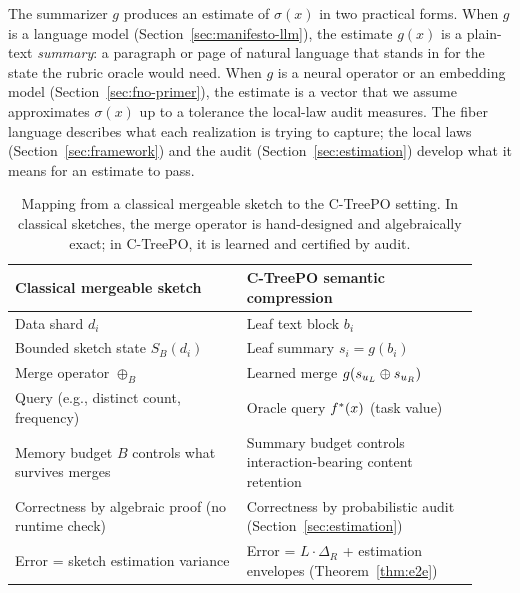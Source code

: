 The summarizer $g$ produces an estimate of $\sigma(x)$ in two
practical forms. When $g$ is a language model
(Section~\ref{sec:manifesto-llm}), the estimate $g(x)$ is a
plain-text \emph{summary}: a paragraph or page of natural language
that stands in for the state the rubric oracle would need. When $g$
is a neural operator or an embedding model
(Section~\ref{sec:fno-primer}), the estimate is a vector that we
assume approximates $\sigma(x)$ up to a tolerance the local-law audit
measures. The fiber language describes what each realization is
trying to capture; the local laws (Section~\ref{sec:framework}) and
the audit (Section~\ref{sec:estimation}) develop what it means for
an estimate to pass.

\begin{table}[t]
    \centering
    \small
    \begin{tabular}{p{0.46\linewidth}p{0.46\linewidth}}
        \toprule
        Classical mergeable sketch & C-TreePO semantic compression \\
        \midrule
        Data shard $d_i$ & Leaf text block $b_i$ \\
        Bounded sketch state $S_B(d_i)$ & Leaf summary $s_i = g(b_i)$ \\
        Merge operator $\oplus_B$ & Learned merge $g(s_{u_L}\oplus s_{u_R})$ \\
        Query (e.g., distinct count, frequency) & Oracle query $f^\ast(x)$ (task value) \\
        Memory budget $B$ controls what survives merges & Summary budget controls interaction-bearing content retention \\
        Correctness by algebraic proof (no runtime check) & Correctness by probabilistic audit (Section~\ref{sec:estimation}) \\
        Error = sketch estimation variance & Error = $L \cdot \Delta_R$ + estimation envelopes (Theorem~\ref{thm:e2e}) \\
        \bottomrule
    \end{tabular}
    \caption{Mapping from a classical mergeable sketch to the C-TreePO setting. In classical sketches, the merge operator is hand-designed and algebraically exact; in C-TreePO, it is learned and certified by audit.}
    \label{tab:sketch-mapping}
\end{table}

